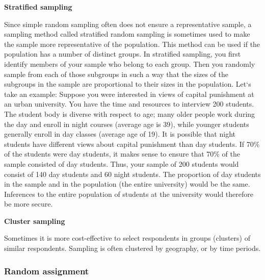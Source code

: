 \documentclass[
  12pt,
  oneside]{book}
\theoremstyle{definition}
\theoremstyle{definition}
\theoremstyle{definition}
\theoremstyle{definition}
\theoremstyle{remark}
\begin{document}
\textbf{Stratified sampling}

Since simple random sampling often does not ensure a representative sample, a
sampling method called stratified random sampling is sometimes used to make the
sample more representative of the population. This method can be used if the
population has a number of distinct groups. In stratified sampling, you
first identify members of your sample who belong to each group. Then you
randomly sample from each of those subgroups in such a way that the sizes of the
subgroups in the sample are proportional to their sizes in the population.
Let`s take an example: Suppose you were interested in views of capital
punishment at an urban university. You have the time and resources to interview
200 students. The student body is diverse with respect to age; many older people
work during the day and enroll in night courses (average age is 39), while younger
students generally enroll in day classes (average age of 19). It is possible that night
students have different views about capital punishment than day students. If 70\%
of the students were day students, it makes sense to ensure that 70\% of the sample
consisted of day students. Thus, your sample of 200 students would consist of 140
day students and 60 night students. The proportion of day students in the sample
and in the population (the entire university) would be the same. Inferences to the
entire population of students at the university would therefore be more secure.

\textbf{Cluster sampling}

Sometimes it is more cost-effective to select respondents in groups (clusters) of similar respondents. Sampling is often clustered by geography, or by time periods.

\hypertarget{random-assignment}{%
\subsubsection{Random assignment}\label{random-assignment}}
\end{document}
